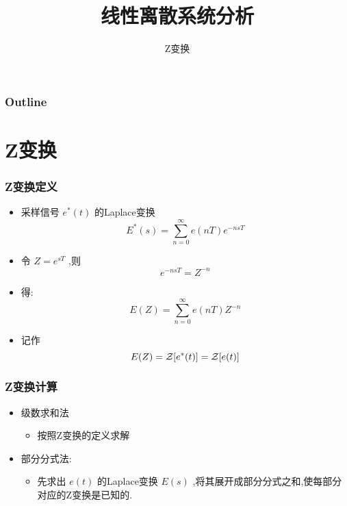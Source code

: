 \documentclass[table]{beamer}
\subtitle{Z变换}
\title{线性离散系统分析}
\author{}
\date{}
\begin{document}
\maketitle

\begin{frame}
\frametitle{Outline}
\setcounter{tocdepth}{3}
\tableofcontents
\end{frame}












\section{Z变换}
\label{sec-1}
\begin{frame}
\frametitle{Z变换定义}
\label{sec-1-1}

\begin{itemize}
\item 采样信号  $e^*(t)$  的Laplace变换  
      \[E^*(s)=\sum_{n=0}^{\infty}e(nT)e^{-nsT}\]
\item <2->令  $Z=e^{sT}$ ,则  
      \[e^{-nsT}=Z^{-n}\]
\item <3->得:  
      \[E(Z)=\sum_{n=0}^{\infty}e(nT)Z^{-n}\]
\item <3->记作  
      \[E(Z)={\cal Z}[e^*(t)]={\cal Z}[e(t)]\]
\end{itemize}
\end{frame}
\begin{frame}
\frametitle{Z变换计算}
\label{sec-1-2}

\begin{itemize}
\item 级数求和法
\begin{itemize}
\item 按照Z变换的定义求解
\end{itemize}
\item 部分分式法:
\begin{itemize}
\item 先求出  $e(t)$  的Laplace变换  $E(s)$  ,将其展开成部分分式之和,使每部分对应的Z变换是已知的.
\end{itemize}
\end{itemize}
\end{frame}
\end{document}

